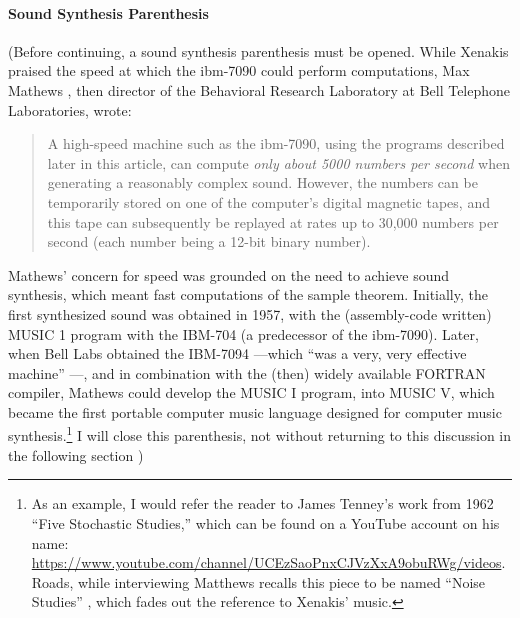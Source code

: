 
\paragraph{Sound Synthesis Parenthesis}
(Before continuing, a sound synthesis parenthesis must be opened. While Xenakis praised the speed at which the \gls{ibm-7090} could perform computations, Max Mathews \parencite{Mat63:The}, then director of the Behavioral Research Laboratory at Bell Telephone Laboratories, wrote:

\begin{quote}
	A high-speed machine such as the \gls{ibm-7090}, using the programs described later in this article, can compute \textit{only about 5000 numbers per second} when generating a reasonably complex sound. However, the numbers can be temporarily stored on one of the computer's digital magnetic tapes, and this tape can subsequently be replayed at rates up to 30,000 numbers per second (each number being a 12-bit binary number). \im \parencite[553]{Mat63:The}
\end{quote}

Mathews' concern for speed was grounded on the need to achieve sound synthesis, which meant fast computations of the sample theorem. Initially, the first synthesized sound was obtained in 1957, with the (assembly-code written) MUSIC 1 program with the IBM-704 (a predecessor of the \gls{ibm-7090}). Later, when Bell Labs obtained the IBM-7094 ---which ``was a very, very effective machine'' \parencite[16]{Roa80:Int}---, and in combination with the (then) widely available FORTRAN compiler, Mathews could develop the MUSIC I program, into MUSIC V, which became the first portable computer music language designed for computer music synthesis.\footnote{As an example, I would refer the reader to James Tenney's work from 1962 ``Five Stochastic Studies,'' which can be found on a YouTube account on his name: \url{https://www.youtube.com/channel/UCEzSaoPnxCJVzXxA9obuRWg/videos}. Roads, while interviewing Matthews recalls this piece to be named ``Noise Studies'' \parencite[18]{Roa80:Int}, which fades out the reference to Xenakis' music.} I will close this parenthesis, not without returning to this discussion in the following section )


